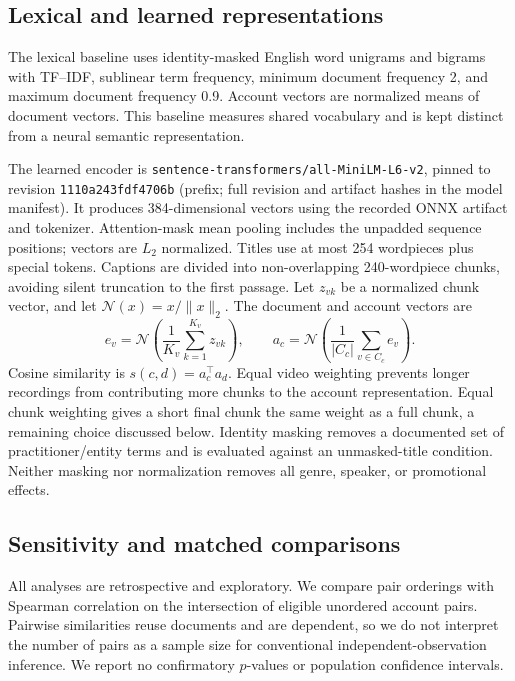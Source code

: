 \subsection{Lexical and learned representations}
The lexical baseline uses identity-masked English word unigrams and bigrams with TF--IDF, sublinear term frequency, minimum document frequency 2, and maximum document frequency 0.9. Account vectors are normalized means of document vectors. This baseline measures shared vocabulary and is kept distinct from a neural semantic representation.

The learned encoder is \texttt{sentence-transformers/all-MiniLM-L6-v2}, pinned to revision \texttt{1110a243fdf4706b} (prefix; full revision and artifact hashes in the model manifest). It produces 384-dimensional vectors using the recorded ONNX artifact and tokenizer. Attention-mask mean pooling includes the unpadded sequence positions; vectors are $L_2$ normalized. Titles use at most 254 wordpieces plus special tokens. Captions are divided into non-overlapping 240-wordpiece chunks, avoiding silent truncation to the first passage. Let $z_{vk}$ be a normalized chunk vector, and let $\mathcal{N}(x)=x/\|x\|_2$. The document and account vectors are
\begin{equation}
 e_v=\mathcal{N}\!\left(\frac{1}{K_v}\sum_{k=1}^{K_v}z_{vk}\right),\qquad
 a_c=\mathcal{N}\!\left(\frac{1}{|C_c|}\sum_{v\in C_c}e_v\right).
\end{equation}
Cosine similarity is $s(c,d)=a_c^\top a_d$. Equal video weighting prevents longer recordings from contributing more chunks to the account representation. Equal chunk weighting gives a short final chunk the same weight as a full chunk, a remaining choice discussed below. Identity masking removes a documented set of practitioner/entity terms and is evaluated against an unmasked-title condition. Neither masking nor normalization removes all genre, speaker, or promotional effects.

\subsection{Sensitivity and matched comparisons}
All analyses are retrospective and exploratory. We compare pair orderings with Spearman correlation on the intersection of eligible unordered account pairs. Pairwise similarities reuse documents and are dependent, so we do not interpret the number of pairs as a sample size for conventional independent-observation inference. We report no confirmatory $p$-values or population confidence intervals.

